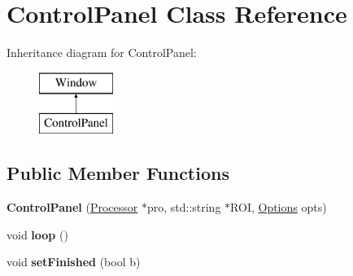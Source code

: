 \hypertarget{classControlPanel}{\section{Control\-Panel Class Reference}
\label{classControlPanel}
}
Inheritance diagram for Control\-Panel\-:\begin{figure}[H]
\begin{center}
\leavevmode
\includegraphics[height=2.000000cm]{classControlPanel}
\end{center}
\end{figure}
\subsection*{Public Member Functions}
\begin{DoxyCompactItemize}
\item 
\hypertarget{classControlPanel_a4d07f91393bf2d7a21f8d1124a778565}{{\bfseries Control\-Panel} (\hyperlink{classProcessor}{Processor} $\ast$pro, std\-::string $\ast$R\-O\-I, \hyperlink{structOptions}{Options} opts)}\label{classControlPanel_a4d07f91393bf2d7a21f8d1124a778565}

\item 
\hypertarget{classControlPanel_a7e05289f0fa706c91390507cbc620670}{void {\bfseries loop} ()}\label{classControlPanel_a7e05289f0fa706c91390507cbc620670}

\item 
\hypertarget{classControlPanel_a7cd10d20e519c32adb96c8a22d2c77cb}{void {\bfseries set\-Finished} (bool b)}\label{classControlPanel_a7cd10d20e519c32adb96c8a22d2c77cb}

\end{DoxyCompactItemize}
